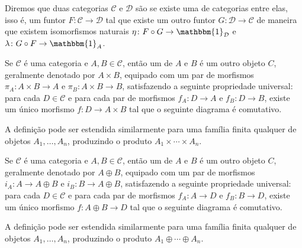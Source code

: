 Diremos que duas categorias $\mathcal{C}$ e $\mathcal{D}$ são  se existe uma  de categorias entre elas, isso é, um funtor $F \colon \mathcal{C} \to \mathcal{D}$ tal que existe um outro funtor $G \colon \mathcal{D} \to \mathcal{C}$ de maneira que existem isomorfismos naturais $\eta \colon F \circ G \to \mathbbm{1}_\mathcal{D}$ e $\lambda \colon G \circ F \to \mathbbm{1}_A$.

Se $\mathcal{C}$ é uma categoria e $A, B \in \mathcal{C}$, então um  de $A$ e $B$ é um outro objeto $C$, geralmente denotado por $A \times B$, equipado com um par de morfismos $\pi_A \colon A \times B \to A$ e $\pi_B \colon A \times B \to B$, satisfazendo a seguinte propriedade universal: para cada $D \in \mathcal{C}$ e para cada par de morfismos $f_A \colon D \to A$ e $f_B \colon D \to B$, existe um único morfismo $f \colon D \to A \times B$ tal que o seguinte diagrama é comutativo.
\begin{center}
\end{center}
A definição pode ser estendida similarmente para uma família finita qualquer de objetos $A_1, \dots, A_n$, produzindo o produto $A_1 \times \cdots \times A_n$.

Se $\mathcal{C}$ é uma categoria e $A, B \in \mathcal{C}$, então um  de $A$ e $B$ é um outro objeto $C$, geralmente denotado por $A \oplus B$, equipado com um par de morfismos $i_A \colon A \to A \oplus B$ e $i_B \colon B \to A \oplus B$, satisfazendo a seguinte propriedade universal: para cada $D \in \mathcal{C}$ e para cada par de morfismos $f_A \colon A \to D$ e $f_B \colon B \to D$, existe um único morfismo $f \colon A \oplus B \to D$ tal que o seguinte diagrama é comutativo.
\begin{center}
\end{center}
A definição pode ser estendida similarmente para uma família finita qualquer de objetos $A_1, \dots, A_n$, produzindo o produto $A_1 \oplus \cdots \oplus A_n$.

